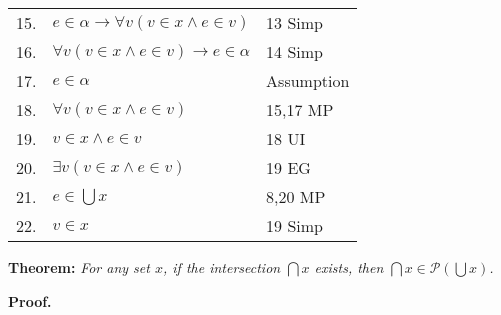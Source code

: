 \documentclass[12pt, a4paper]{article}
\begin{document}
\begin{table}[h!]
\begin{center}
\begin{tabular}{l l l}
        15.& \hspace{10mm}$e\in\alpha\rightarrow\forall v(v\in x\wedge e\in v)$ & 13 Simp\\
        16.& \hspace{10mm}$\forall v(v\in x\wedge e\in v)\rightarrow e\in\alpha$ & 14 Simp\\
        17.& \hspace{10mm}$e\in\alpha$ & Assumption\\
        18.& \hspace{20mm}$\forall v(v\in x\wedge e\in v)$ & 15,17 MP\\
        19.& \hspace{20mm}$v\in x\wedge e\in v$ & 18 UI\\
        20.& \hspace{20mm}$\exists v(v\in x\wedge e\in v)$ & 19 EG\\
        21.& \hspace{20mm}$e\in\bigcup x$ & 8,20 MP\\
        22.& \hspace{20mm}$v\in x$ & 19 Simp\\
        
        \hline
        \end{tabular}
    \end{center}
\end{table}

\restoregeometry

\noindent\textbf{Theorem: }\textit{For any set $x$, if the intersection $\bigcap x$ exists, then $\bigcap x\in\mathcal{P}(\bigcup x)$.}

\vspace{4mm}

\noindent\textbf{Proof.}
\end{document}
